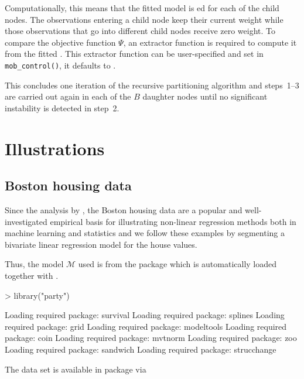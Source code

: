 \documentclass{Z}
\begin{document}
Computationally, this means that the fitted model  is ed
for each of the child nodes. The observations entering a child node keep their
current weight while those observations that go into different child nodes receive
zero weight. To compare the objective function $\Psi$, an extractor function
is required to compute it from the fitted . This extractor function
can be user-specified and set in \verb:mob_control():, it defaults to .


This concludes one iteration of the recursive partitioning algorithm and steps~1--3
are carried out again in each of the $B$ daughter nodes until no significant 
instability is detected in step~2.

\section{Illustrations}
\label{sec:illustration}

\subsection{Boston housing data}

Since the analysis by \cite{BreimanFriedman1985}, the Boston housing data are 
a popular and well-investigated empirical basis for illustrating non-linear 
regression methods both in machine learning and statistics
\citep[see][for two recent examples]{Gama2004,Samarovetal2005} and we follow 
these examples by segmenting a bivariate linear regression model for the house
values.

Thus, the model $\mathcal{M}$ used is  from the 
package which is automatically loaded together with .

\begin{Schunk}
\begin{Sinput}
> library("party")
\end{Sinput}
\begin{Soutput}
Loading required package: survival
Loading required package: splines
Loading required package: grid
Loading required package: modeltools
Loading required package: coin
Loading required package: mvtnorm
Loading required package: zoo
Loading required package: sandwich
Loading required package: strucchange
\end{Soutput}
\end{Schunk}

The data set is available in package  via
\end{document}
